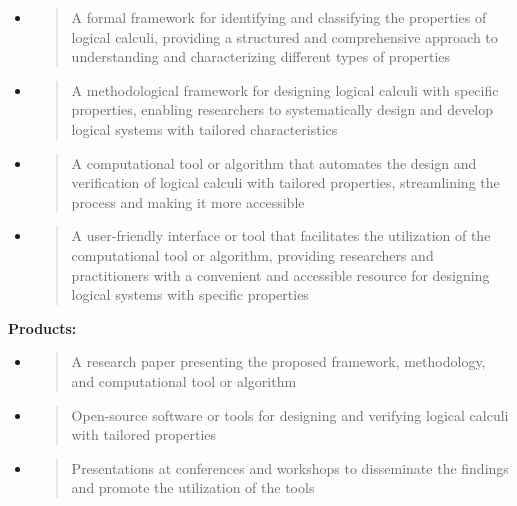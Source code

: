 \begin{itemize}
\item
  \begin{quote}
  A formal framework for identifying and classifying the properties of
  logical calculi, providing a structured and comprehensive approach to
  understanding and characterizing different types of properties
  \end{quote}
\item
  \begin{quote}
  A methodological framework for designing logical calculi with specific
  properties, enabling researchers to systematically design and develop
  logical systems with tailored characteristics
  \end{quote}
\item
  \begin{quote}
  A computational tool or algorithm that automates the design and
  verification of logical calculi with tailored properties, streamlining
  the process and making it more accessible
  \end{quote}
\item
  \begin{quote}
  A user-friendly interface or tool that facilitates the utilization of
  the computational tool or algorithm, providing researchers and
  practitioners with a convenient and accessible resource for designing
  logical systems with specific properties
  \end{quote}
\end{itemize}

\textbf{Products:}

\begin{itemize}
\item
  \begin{quote}
  A research paper presenting the proposed framework, methodology, and
  computational tool or algorithm
  \end{quote}
\item
  \begin{quote}
  Open-source software or tools for designing and verifying logical
  calculi with tailored properties
  \end{quote}
\item
  \begin{quote}
  Presentations at conferences and workshops to disseminate the findings
  and promote the utilization of the tools
  \end{quote}
\end{itemize}

